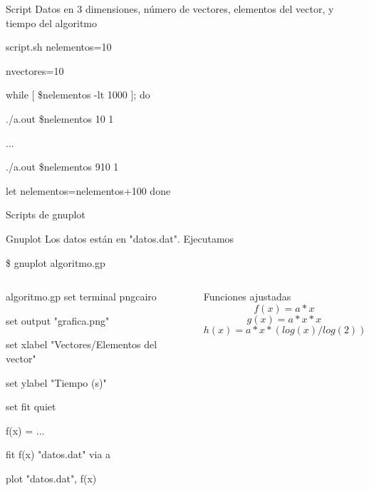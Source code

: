 
\begin{frame}
	\begin{block}{Script}
	Datos en 3 dimensiones, número de vectores, elementos del vector, y tiempo del algoritmo
	\end{block}
	
	\begin{exampleblock}{script.sh}
	nelementos=10

	nvectores=10

	while [ \$nelementos -lt 1000 ]; do
   	
   		./a.out \$nelementos 10 1
      		
   		...
   		
   		./a.out \$nelementos 910 1

   		let nelementos=nelementos+100
	done
	\end{exampleblock}
\end{frame}


\begin{frame}{Scripts de gnuplot}
	\begin{block}{Gnuplot}		
		Los datos están en "datos.dat". Ejecutamos	
			
		\hspace{1cm}\$ gnuplot algoritmo.gp
	\end{block}
	\pause
	
	\begin{columns}

	\begin{column}{5cm}
	\begin{exampleblock}{algoritmo.gp}
	set terminal pngcairo
	
	set output "grafica.png"

	set xlabel "Vectores/Elementos del vector"

	set ylabel "Tiempo (s)"

	set fit quiet

	f(x) = ...

	fit f(x) "datos.dat" via a

	plot "datos.dat", f(x)
	\end{exampleblock}
	\end{column}
	\pause
	
	\begin{column}{5cm}
	\begin{block}{Funciones ajustadas}
		\[f(x) = a*x\]
		\[g(x) = a*x*x\]
		\[h(x) = a*x*(log(x)/log(2))\]
	\end{block}
	\end{column}
	
	\end{columns}
\end{frame}

